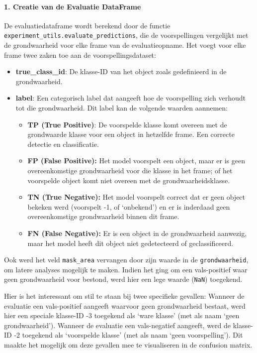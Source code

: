 \paragraph{1. Creatie van de Evaluatie DataFrame}
De evaluatiedataframe wordt berekend door de functie\\ \texttt{experiment\_utils.evaluate\_predictions},
die de voorspellingen vergelijkt met de grondwaarheid voor elke frame van de evaluatieopname.
Het voegt voor elke frame twee zaken toe aan de voorspellingsdataset:
\begin{itemize}
    \item \textbf{true\_class\_id}: De klasse-ID van het object zoals gedefinieerd in de grondwaarheid.
    \item \textbf{label}: Een categorisch label dat aangeeft hoe de voorspelling zich verhoudt tot die grondwaarheid. Dit label kan de volgende waarden aannemen:
        \begin{itemize}
            \item \textbf{TP (True Positive)}: De voorspelde klasse komt overeen met de grondwaarde klasse voor een object in hetzelfde frame. 
            Een correcte detectie en classificatie.
            \item \textbf{FP (False Positive):} Het model voorspelt een object, maar er is geen overeenkomstige grondwaarheid 
            voor die klasse in het frame; of het voorspelde object komt niet overeen met de grondwaarheidsklasse.
            \item \textbf{TN (True Negative):} Het model voorspelt correct dat er geen object bekeken werd (voorspelt -1, of `onbekend') 
            en er is inderdaad geen overeenkomstige grondwaarheid binnen dit frame.
            \item \textbf{FN (False Negative):} Er is een object in de grondwaarheid aanwezig, maar het model heeft dit object niet gedetecteerd of geclassificeerd.
        \end{itemize} 
\end{itemize}
Ook werd het veld \texttt{mask\_area} vervangen door zijn waarde in de \texttt{grondwaarheid}, om latere analyses mogelijk te maken.
Indien het ging om een vals-positief waar geen grondwaarheid voor bestond, werd hier een lege waarde (\texttt{NaN}) toegekend. 

Hier is het interessant om stil te staan bij twee specifieke gevallen:
Wanneer de evaluatie een vals-positief aangeeft waarvoor geen grondwaarheid bestaat, werd hier een speciale klasse-ID -3 toegekend als `ware klasse' (met als naam `geen grondwaarheid').
Wanneer de evaluatie een vals-negatief aangeeft, werd de klasse-ID -2 toegekend als `voorspelde klasse' (met als naam `geen voorspelling').
Dit maakte het mogelijk om deze gevallen mee te visualiseren in de confusion matrix.

